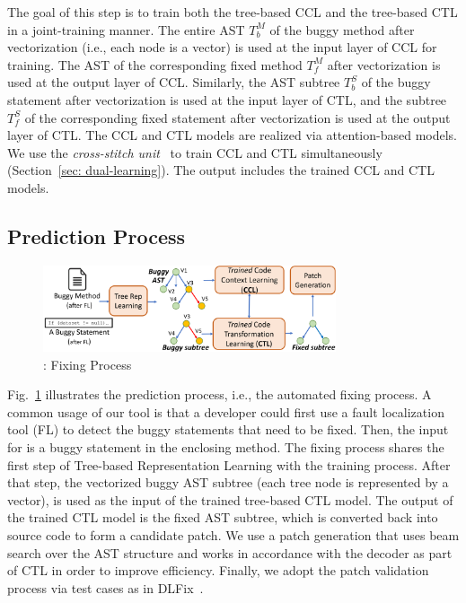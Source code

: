 \vspace{2pt}
  The goal of this step is to train both the tree-based CCL
and the tree-based CTL in a joint-training manner. The entire AST
$T^{M}_b$ of the buggy method after vectorization (i.e., each node is
a vector) is used at the input layer of CCL for training. The AST of
the corresponding fixed method $T^{M}_f$ after vectorization is used
at the output layer of CCL. Similarly, the AST subtree
$T^{S}_b$ of the buggy statement after vectorization is used at the
input layer of CTL, and the subtree $T^{S}_f$ of the corresponding
fixed statement after vectorization is used at the output layer of
CTL. The CCL and CTL models are realized via attention-based
 models. We use the {\em cross-stitch
  unit}~\cite{misra2016cross} to train CCL and CTL simultaneously
(Section~\ref{sec: dual-learning}).
The output includes the trained CCL and CTL models.

\subsection{Prediction Process}

\begin{figure}[t]
	\centering
	\includegraphics[width=3.4in]{graphs/overview-predict-3.png}
	\caption{{\tool}: Fixing Process}
        \vspace{-3pt}
	\label{overview-fixing}
\end{figure}

Fig.~\ref{overview-fixing} illustrates the prediction process, i.e.,
the automated fixing process. A common usage of our tool is that
a developer could first use a fault localization tool
(FL) to detect the buggy statements that need to be fixed. Then, the
input for {\tool} is a buggy statement in the enclosing method.
The fixing process shares the first step of Tree-based Representation
Learning with the training process. After that step, the vectorized
buggy AST subtree (each tree node is represented by a vector), is used
as the input of the trained tree-based CTL model. The output of the
trained CTL model is the fixed AST subtree, which is converted back
into source code to form a candidate patch. We use a patch
generation that uses beam search over the AST structure and works in
accordance with the decoder as part of CTL in order to improve
efficiency. Finally, we adopt the patch validation process via test
cases as in DLFix~\cite{icse20}.




